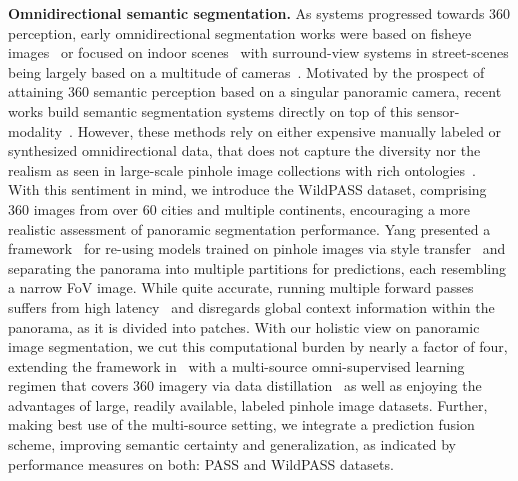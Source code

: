 \documentclass[final]{cvpr}
\begin{document}
\noindent
\textbf{Omnidirectional semantic segmentation.}
As systems progressed towards 360 perception, early omnidirectional segmentation works were based on fisheye images~\cite{deng2017cnn,ye2020universal} or focused on indoor scenes~\cite{song2018im2pano3d,tateno2018distortion} with surround-view systems in street-scenes being largely based on a multitude of cameras~\cite{deng2019restricted,narioka2018understanding,pan2020cross,roddick2020predicting}.
Motivated by the prospect of attaining 360 semantic perception based on a singular panoramic camera, recent works build semantic segmentation systems directly on top of this sensor-modality~\cite{budvytis2019large,xu2019semantic,zhang2019orientation}.
However, these methods rely on either expensive manually labeled or synthesized omnidirectional data, that does not capture the diversity nor the realism as seen in large-scale pinhole image collections with rich ontologies~\cite{neuhold2017mapillary,varma2019idd}.
With this sentiment in mind, we introduce the WildPASS dataset, comprising 360 images from over 60 cities and multiple continents, encouraging a more realistic assessment of panoramic segmentation performance.
Yang \etal presented a framework~\cite{yang2020pass,yang2020ds} for re-using models trained on pinhole images via style transfer~\cite{zhu2017unpaired} and separating the panorama into multiple partitions for predictions, each resembling a narrow FoV image.
While quite accurate, running multiple forward passes suffers from high latency~\cite{yang2020pass} and disregards global context information within the panorama, as it is divided into patches.
With our holistic view on panoramic image segmentation, we cut this computational burden by nearly a factor of four, extending the framework in~\cite{yang2020omnisupervised} with a multi-source omni-supervised learning regimen that covers 360 imagery via data distillation~\cite{radosavovic2018data} as well as enjoying the advantages of large, readily available, labeled pinhole image datasets.
Further, making best use of the multi-source setting, we integrate a prediction fusion scheme, improving semantic certainty and generalization, as indicated by performance measures on both: PASS and WildPASS datasets.
\end{document}
